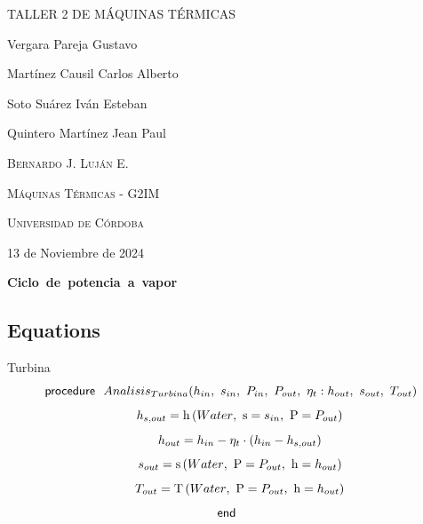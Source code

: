 \documentclass[10pt,fleqn]{article}
\author{Gustavo Vergara}
\theoremstyle{mytheoremstyle}
\theoremstyle{mytheoremstyle}
\theoremstyle{myproblemstyle}
\newcommand{\F}[1]{\mbox{$#1$}}
\newcommand{\K}[1]{\mbox{\sf#1\ \ \mit}}
\newcommand{\I}{\mbox{\hspace{0.20in}}}
\newcommand{\temperature}{\mathrm{T}}
\newcommand{\enthalpy}{\mathrm{h}}
\newcommand{\entropy}{\mathrm{s}}
\begin{document}
\begin{titlepage}
	\centering
	\vspace{2.5cm}
	{\scshape \Large TALLER 2 DE MÁQUINAS TÉRMICAS\par}
	\vspace{7cm}
	\textbf\large\scshape{\par}
	\vspace{0.5cm}
	{\Large Vergara Pareja Gustavo\par}
    {\Large Martínez Causil Carlos Alberto\par}
    {\Large Soto Suárez Iván Esteban\par}
    {\Large Quintero Martínez Jean Paul\par}
	\vspace{6cm}
	{\scshape\Large Bernardo J. Luján E. \par}
	\vspace{0.3cm}
	{\scshape\Large Máquinas Térmicas - G2IM \par}
	\vspace{0.3cm}
	{\scshape\Large Universidad de Córdoba\par}
	\vspace{0.3cm}
	{\Large 13 de Noviembre de 2024 \par}
\end{titlepage}
\begin{center}
\bf \mbox{Ciclo de potencia a vapor}
\vspace{0.2 in}
\end{center}
\subsection*{Equations}

\vspace{0.10in}
\noindent
{\color{blue} \rm Turbina}
\begin{equation}
\label{EES Eqn:1}
\K{procedure} \F{Analisis_{Turbina}}{ \left( h_{in},\ s_{in},\ P_{in},\ P_{out},\ \eta_{t}:h_{out},\ s_{out},\ T_{out} \right) } 
\end{equation}
\begin{equation}
\I \label{EES Eqn:2}
h_{s,out} = \enthalpy \left(\F{Water},\mbox{\ s}=s_{in},\mbox{\ P}=P_{out} \right)  
\end{equation}
\begin{equation}
\I \label{EES Eqn:3}
h_{out} = h_{in}-\eta_{t}\cdot  \left( h_{in}-h_{s,out} \right)  
\end{equation}
\begin{equation}
\I \label{EES Eqn:4}
s_{out} = \entropy \left(\F{Water},\mbox{\ P}=P_{out},\mbox{\ h}=h_{out} \right)  
\end{equation}
\begin{equation}
\I \label{EES Eqn:5}
T_{out} = \temperature \left(\F{Water},\mbox{\ P}=P_{out},\mbox{\ h}=h_{out} \right)  
\end{equation}
\begin{equation}
\label{EES Eqn:6}
\K{end} 
\end{equation}
\end{document}
